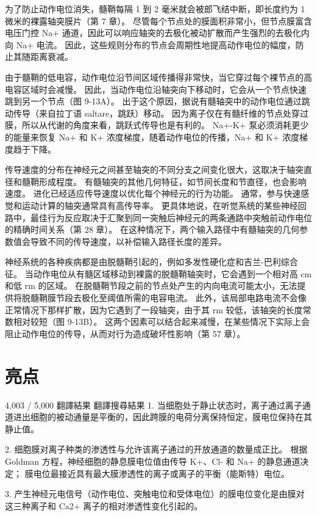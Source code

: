 为了防止动作电位消失，髓鞘每隔 1 到 2 毫米就会被郎飞结中断，即长度约为 1 微米的裸露轴突膜片（第 7 章）。 尽管每个节点处的膜面积非常小，但节点膜富含电压门控 Na+ 通道，因此可以响应轴突的去极化被动扩散而产生强烈的去极化内向 Na+ 电流。 因此，这些规则分布的节点会周期性地提高动作电位的幅度，防止其随距离衰减。

由于髓鞘的低电容，动作电位沿节间区域传播得非常快，当它穿过每个裸节点的高电容区域时会减慢。 因此，当动作电位沿轴突向下移动时，它会从一个节点快速跳到另一个节点（图 9-13A）。 出于这个原因，据说有髓轴突中的动作电位通过跳动传导（来自拉丁语 saltare，跳跃）移动。 因为离子仅在有髓纤维的节点处穿过膜，所以从代谢的角度来看，跳跃式传导也是有利的。 Na+-K+ 泵必须消耗更少的能量来恢复 Na+ 和 K+ 浓度梯度，随着动作电位的传播，Na+ 和 K+ 浓度梯度趋于下降。

传导速度的分布在神经元之间甚至轴突的不同分支之间变化很大，这取决于轴突直径和髓鞘形成程度。 有髓轴突的其他几何特征，如节间长度和节直径，也会影响速度。 进化已经适应传导速度以优化每个神经元的行为功能。 通常，参与快速感觉和运动计算的轴突通常具有高传导率。 更具体地说，在听觉系统的某些神经回路中，最佳行为反应取决于汇聚到同一突触后神经元的两条通路中突触前动作电位的精确时间关系（第 28 章）。 在这种情况下，两个输入路径中有髓轴突的几何参数值会导致不同的传导速度，以补偿输入路径长度的差异。

神经系统的各种疾病都是由脱髓鞘引起的，例如多发性硬化症和吉兰-巴利综合征。 当动作电位从有髓区域移动到裸露的脱髓鞘轴突时，它会遇到一个相对高 cm 和低 rm 的区域。 在脱髓鞘节段之前的节点处产生的内向电流可能太小，无法提供将脱髓鞘膜节段去极化至阈值所需的电容电流。 此外，该局部电路电流不会像正常情况下那样扩散，因为它遇到了一段轴突，由于其 rm 较低，该轴突的长度常数相对较短（图 9-13B）。 这两个因素可以结合起来减慢，在某些情况下实际上会阻止动作电位的传导，从而对行为造成破坏性影响（第 57 章）。


\section{亮点}

4,003 / 5,000
翻譯結果
翻譯搜尋結果
1. 当细胞处于静止状态时，离子通过离子通道进出细胞的被动通量是平衡的，因此跨膜的电荷分离保持恒定，膜电位保持在其静止值。 

2. 细胞膜对离子种类的渗透性与允许该离子通过的开放通道的数量成正比。 根据 Goldman 方程，神经细胞的静息膜电位值由传导 K+、Cl- 和 Na+ 的静息通道决定； 膜电位最接近具有最大膜渗透性的离子或离子的平衡（能斯特）电位。 

3. 产生神经元电信号（动作电位、突触电位和受体电位）的膜电位变化是由膜对这三种离子和 Ca2+ 离子的相对渗透性变化引起的。 

